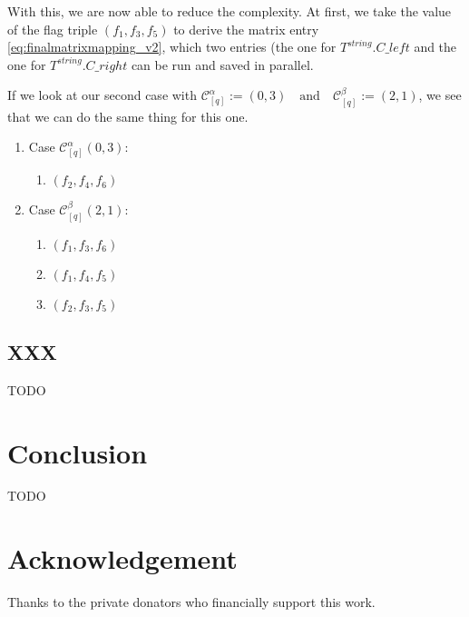 \documentclass{article}
\newtheorem*{theorem A}{Theorem A}
\newtheorem*{theorem B}{N\"olker's Theorem}
\theoremstyle{remark}
\theoremstyle{remark}
\begin{document}
With this, we are now able to reduce the complexity. At first, we take the value of the flag triple $\left(f_{1}, f_{3}, f_{5}\right)$ to derive the matrix entry \ref{eq:finalmatrixmapping_v2}, which two entries (the one for $T^{string}.C\_left$ and the one for $T^{string}.C\_right$ can be run and saved in parallel.

If we look at our second case with $\mathcal{C}^{\alpha}_{[q]} := \left(0,3\right) \quad \mathrm{and} \quad \mathcal{C}^{\beta}_{[q]} := \left(2,1\right)$, we see that we can do the same thing for this one.

\begin{enumerate}
    \item Case $\mathcal{C}^{\alpha}_{[q]}\left(0,3\right)$:
        \begin{enumerate}
            \item $\left(f_{2}, f_{4}, f_{6}\right)$
        \end{enumerate}

    \item Case $\mathcal{C}^{\beta}_{[q]}\left(2,1\right)$:
        \begin{enumerate}
            \item $\left(f_{1}, f_{3}, f_{6}\right)$
            \item $\left(f_{1}, f_{4}, f_{5}\right)$
            \item $\left(f_{2}, f_{3}, f_{5}\right)$
        \end{enumerate}
\end{enumerate}
\subsection{XXX}
\label{ss:XXX}
TODO
\section*{Conclusion}
\label{s:conclusion}
TODO
\section*{Acknowledgement}
\label{s:acknowledgement}
Thanks to the private donators who financially support this work.
\end{document}
